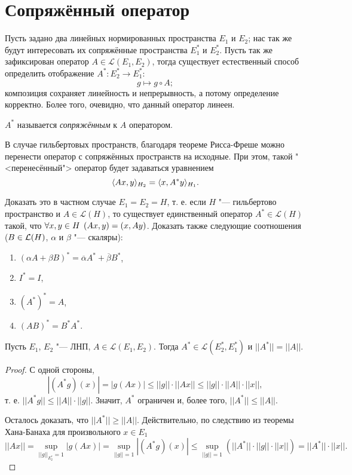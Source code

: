 \documentclass[main]{subfiles}
\begin{document}
\section{Сопряжённый оператор} %

Пусть задано два линейных нормированных пространства
$E_1$ и $E_2$; нас так же будут
интересовать их сопряжённые пространства
$E_1^*$ и $E_2^*$.
Пусть так же зафиксирован оператор $A \in \mathcal{L}(E_1, E_2)$,
тогда существует естественный способ определить
отображение $A^* : E_2^* \to E_1^*$:
\[
  g \mapsto g \circ A;
\]
композиция сохраняет линейность
и непрерывность, а потому определение корректно.
Более того, очевидно, что данный оператор линеен.

\begin{definition}
  \( A^* \) называется \emph{сопряжённым} к \( A \) оператором.
\end{definition}

В случае гильбертовых пространств, благодаря теореме
Рисса-Фреше можно перенести оператор с сопряжённых пространств
на исходные. При этом, такой "<перенесённый"> оператор
будет задаваться уравнением
\[
  \langle A x, y \rangle_{H_2} = \langle x, A^* y \rangle_{H_1}.
\]

\begin{exercise}
  Доказать это в частном случае \( E_1 = E_2 = H \),
  т. е. если \(H \) "--- гильбертово пространство и
  \( A \in \mathcal{L}(H) \), то
  существует единственный оператор
  \( A^* \in \mathcal{L}(H) \) такой,
  что
  \( \forall {x, y \in H} \; \, (Ax, y) = (x, Ay) \).
  Доказать также следующие соотношения
  (\( B \in \Linears{H} \),
  \( \alpha \) и \( \beta \) "--- скаляры):
  \begin{enumerate}
    \item $(\alpha A + \beta B)^* = \overline{\alpha} A^* + \overline{\beta} B^*$,
    \item $I^* = I$,
    \item $(A^*)^* = A$,
    \item $(AB)^* = B^* A^*$.
  \end{enumerate}
\end{exercise}

\begin{theorem}%
  Пусть $E_1$, $E_2$ "--- ЛНП,
  $A \in \mathcal{L}(E_1, E_2)$.
  Тогда $A^* \in \mathcal{L}(E_2^*, E_1^*)$
  и $||A^*|| = ||A||$.
\end{theorem}
\begin{proof}
  С одной стороны,
  \[
    |(A^* g)(x)| = |g(Ax)| \le
    ||g|| \cdot ||Ax|| \le ||g|| \cdot ||A|| \cdot ||x||,
  \]
  т. е. $||A^* g|| \le ||A|| \cdot ||g||$.
  Значит, $A^*$ ограничен и, более того,
  $||A^*|| \le ||A||$.

  Осталось доказать, что $||A^*|| \ge ||A||$.
  Действительно, по следствию из теоремы Хана-Банаха для произвольного $x \in E_1$
  \[
    ||A x|| = \sup_{||g||_{E_2^*} = 1} |g(Ax)| =
    \sup_{||g|| = 1} |(A^* g)(x)| \le
    \sup_{||g|| = 1} \left(||A^*|| \cdot ||g|| \cdot ||x||\right) =
    ||A^*|| \cdot ||x||.
  \]
\end{proof}
\end{document}
